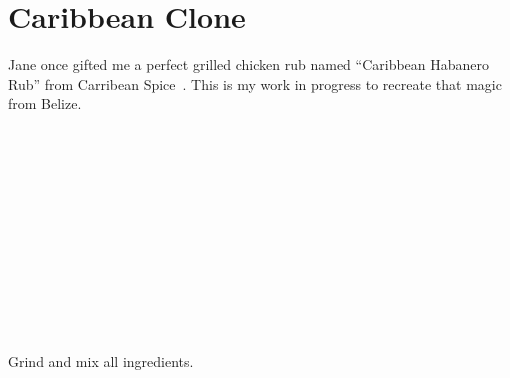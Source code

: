 \section[Caribbean Clone]{Caribbean Clone}

\begin{recipestats}[
        servings=8~\fluidounce,
        preptime=5~\minute,
        source=Mike \& Jane,
    ]
\end{recipestats}

\begin{recipeabstract}
    Jane once gifted me a perfect grilled chicken rub named ``Caribbean
    Habanero Rub'' from Carribean Spice~\cite{caribbeanSpiceBelize}.
    This is my work in progress to recreate that magic from Belize.
\end{recipeabstract}

\begin{ingredientcolumns}
    \begin{ingredientblock}
        \\
        \\
        \\
        \\
        \\
        \\
    \end{ingredientblock}
    \begin{ingredientblock}
        \\
        \\
        \\
        \\
    \end{ingredientblock}
\end{ingredientcolumns}

\begin{preparation}
\item Grind and mix all ingredients.
\end{preparation}

\recipeend%

